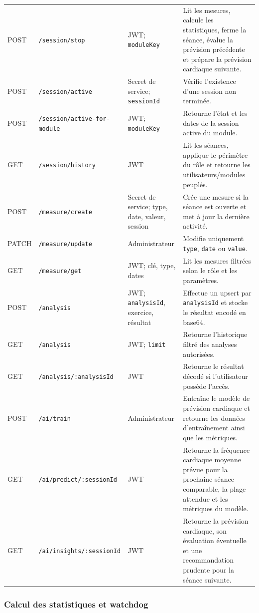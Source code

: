 \documentclass[11pt,a4paper]{article}
\newcommand{\code}[1]{\nolinkurl{#1}}
\begin{document}
\begin{longtable}{L{1.5cm}L{4.2cm}L{4.0cm}L{6.3cm}}
POST & \code{/session/stop} & JWT; \code{moduleKey} & Lit les mesures, calcule les statistiques, ferme la séance, évalue la prévision précédente et prépare la prévision cardiaque suivante. \\
POST & \code{/session/active} & Secret de service; \code{sessionId} & Vérifie l'existence d'une session non terminée. \\
POST & \code{/session/active-for-module} & JWT; \code{moduleKey} & Retourne l'état et les dates de la session active du module. \\
GET & \code{/session/history} & JWT & Lit les séances, applique le périmètre du rôle et retourne les utilisateurs/modules peuplés. \\
POST & \code{/measure/create} & Secret de service; type, date, valeur, session & Crée une mesure si la séance est ouverte et met à jour la dernière activité. \\
PATCH & \code{/measure/update} & Administrateur & Modifie uniquement \code{type}, \code{date} ou \code{value}. \\
GET & \code{/measure/get} & JWT; clé, type, dates & Lit les mesures filtrées selon le rôle et les paramètres. \\
POST & \code{/analysis} & JWT; \code{analysisId}, exercice, résultat & Effectue un upsert par \code{analysisId} et stocke le résultat encodé en base64. \\
GET & \code{/analysis} & JWT; \code{limit} & Retourne l'historique filtré des analyses autorisées. \\
GET & \code{/analysis/:analysisId} & JWT & Retourne le résultat décodé si l'utilisateur possède l'accès. \\
POST & \code{/ai/train} & Administrateur & Entraîne le modèle de prévision cardiaque et retourne les données d'entraînement ainsi que les métriques. \\
GET & \code{/ai/predict/:sessionId} & JWT & Retourne la fréquence cardiaque moyenne prévue pour la prochaine séance comparable, la plage attendue et les métriques du modèle. \\
GET & \code{/ai/insights/:sessionId} & JWT & Retourne la prévision cardiaque, son évaluation éventuelle et une recommandation prudente pour la séance suivante. \\
\bottomrule
\end{longtable}

\subsubsection{Calcul des statistiques et watchdog}
\end{document}

